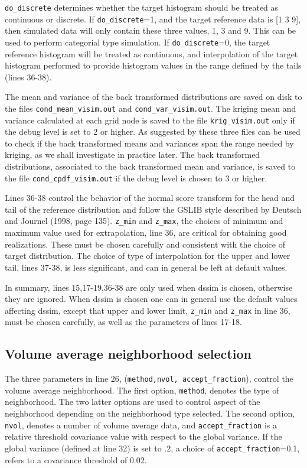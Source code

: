 \documentclass[12t]{article}
\begin{document}
\texttt{do\_discrete} determines whether the target histogram should be treated as continuous or discrete. If \texttt{do\_discrete}=1, and the target reference data is [1 3 9], then simulated data will only contain these three values, 1, 3 and 9. This can be used to perform categorial type simulation. If \texttt{do\_discrete}=0, the target reference histogram will be treated as continuous, and interpolation of the target histogram performed to provide histogram values in the range defined by the tails (lines 36-38).

The mean and variance of the back transformed distributions are saved
on disk to the files \texttt{cond\_mean\_visim.out} and 
\texttt{cond\_var\_visim.out}.
The kriging mean and variance calculated at each grid node is
saved to the file 
\texttt{krig\_visim.out} only if the debug level is set to 2 or higher.
As suggested by \cite{Deutsch:2000:DSSIM-HR} these three files can be used to check if the back transformed
means and variances span the range needed by kriging, as we shall
investigate in practice later.
The back transformed distributions, associated to the back transformed
mean and variance, is saved to the file 
\texttt{cond\_cpdf\_visim.out}
if the debug level is chosen to 3 or higher.

Lines 36-38 control the behavior of the normal score transform for the
head and tail of the reference distribution and follow the GSLIB style described by Deutsch and Journel (1998, page 135).
\texttt{z\_min} and \texttt{z\_max}, the choices of minimum and
maximum value used for extrapolation, line 36, are critical for obtaining good
realizations. These must be chosen carefully and consistent with the choice of
target distribution.
The choice of type of interpolation for the upper and lower tail, lines
37-38, is less significant, and can in general be left at default
values.

In summary, lines 15,17-19,36-38 are only used when dssim is chosen,
otherwise they are ignored. When dssim is chosen one can in general
use the default values affecting dssim, except that upper and lower
limit, \texttt{z\_min} and \texttt{z\_max} in line 36, must be chosen
carefully, as well as the parameters of lines 17-18. 

\subsection{Volume average neighborhood selection} 
The three parameters in line 26, (\texttt{method,nvol,
  accept\_fraction}), control the volume average neighborhood. 
The first option, \texttt{method}, denotes the type of
neighborhood. The two latter options are used to control aspect of the
neighborhood depending on the neighborhood type selected. 
The second option, \texttt{nvol}, denotes a number of volume average
data, and \texttt{accept\_fraction} is a relative threshold covariance
value with respect to the global variance. If the global variance
(defined at line 32) is set to .2, a choice of  
\texttt{accept\_fraction}=0.1, refers to a covariance threshold of $0.02$. 
\end{document}
